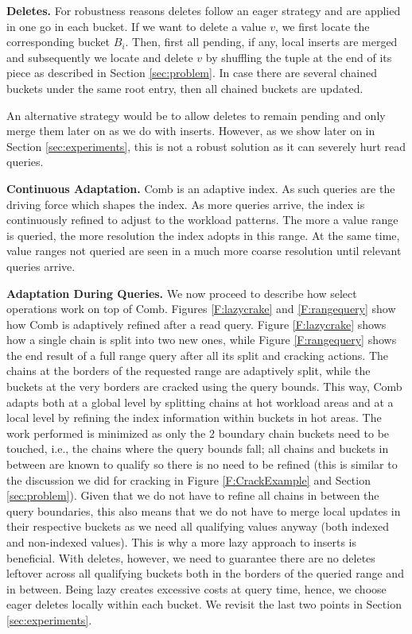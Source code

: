 

\textbf{Deletes.}
For robustness reasons deletes follow an eager strategy and are applied 
in one go in each bucket. If we want to delete a value $v$, we first locate the
corresponding bucket $B_i$. Then, first all pending, if any, local inserts are merged
and subsequently we locate and delete $v$ by shuffling the tuple at the end of its
piece as described in Section \ref{sec:problem}.
In case there are several chained buckets under the same root entry,
then all chained buckets are updated.

An alternative strategy would be to allow deletes to remain pending and only merge them later on
as we do with inserts. However, as we show later on in Section \ref{sec:experiments}, 
this is not a robust solution as it can severely hurt read queries. 

\textbf{Continuous Adaptation.}
Comb is an adaptive index. As such queries are the driving force which shapes the index.
As more queries arrive, the index is continuously refined to adjust to the workload patterns.
The more a value range is queried, the more resolution the index adopts in this range.
At the same time, value ranges not queried are seen in a much more coarse resolution until relevant queries arrive.

\textbf{Adaptation During Queries.}
We now proceed to describe how select operations work  on top of Comb.
Figures \ref{F:lazycrake} and \ref{F:rangequery}  show how Comb is adaptively refined after a read query.
Figure \ref{F:lazycrake} shows how a single chain is split into two new ones,
while Figure \ref{F:rangequery} shows the end result of a full range query after all its split and cracking actions.
The chains at the borders of the requested range are adaptively split, while the buckets
at the very borders are cracked using the query bounds. 
This way, Comb adapts both at a global level by splitting chains at hot workload areas
and at a local level by refining the index information within buckets in hot areas.
The work performed is minimized as only the 2 boundary chain buckets need to be touched, i.e., the chains where the query bounds fall;
all chains and buckets in between are known to qualify so there is no need to be refined 
(this is similar to the discussion we did for cracking 
in Figure \ref{F:CrackExample} and Section \ref{sec:problem}).
Given that we do not have to refine all chains in between the query boundaries, 
this also means that we do not have to merge local updates in their respective buckets 
as we need all qualifying values anyway (both indexed and non-indexed values).
This is why a more lazy approach to inserts is beneficial.
With deletes, however, we need to guarantee there are no deletes leftover across all qualifying buckets
both in the borders of the queried range and in between. Being lazy creates excessive costs at query time, hence,
we choose eager deletes locally within each bucket.
We revisit the last two points in Section \ref{sec:experiments}. 


